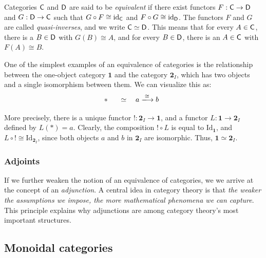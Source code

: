 \begin{definition}
  Categories \( \mathsf{C} \) and \( \mathsf{D} \) are  said to be \emph{equivalent} if there exist functors 
\( F: \mathsf{C} \to \mathsf{D} \) and \( G: \mathsf{D}\to \mathsf{C} \) such that 
\( G \circ F \cong \mathrm{id}_{\mathsf{C}} \) and \( F \circ G \cong \mathrm{id}_{\mathsf{D}} \). 
The functors \( F \) and \( G \) are called \emph{quasi-inverses}, and we write \( \mathsf{C} \simeq \mathsf{D} \).
This means that for every \( A \in \mathsf{C} \), there is a \( B \in \mathsf{D} \) with \( G(B) \cong A \), 
and for every \( B \in \mathsf{D} \), there is an \( A \in \mathsf{C} \) with \( F(A) \cong B \).
\end{definition}

\begin{example}
  One of the simplest examples of an equivalence of categories is the relationship between the one-object category \( \mathbf{1} \) and the category \( \mathbf{2}_I \), which has two objects and a single isomorphism between them. We can visualize this as:
$$
\ast \;\; \quad \simeq \quad a \xlongrightarrow{\;\cong\;} b \;\; 
$$

More precisely, there is a unique functor \( ! : \mathbf{2}_I \to \mathbf{1} \), and a functor \( L : \mathbf{1} \to \mathbf{2}_I \) defined by \( L(\ast) = a \). Clearly, the composition \( ! \circ L \) is equal to \( \mathrm{Id}_{\mathbf{1}} \), and \( L \circ ! \cong \mathrm{Id}_{\mathbf{2}_I} \), since both objects \( a \) and \( b \) in \( \mathbf{2}_I \) are isomorphic. Thus, \( \mathbf{1} \simeq \mathbf{2}_I \).
\end{example}

\subsubsection{Adjoints}
If we further weaken the notion of an equivalence of categories, we we arrive at the concept of an \emph{adjunction}. A central idea in category theory is that \emph{the weaker the assumptions we impose, the more mathematical phenomena we can capture}. This principle explains why adjunctions are among category theory's most important structures.




\subsection{Monoidal categories}

